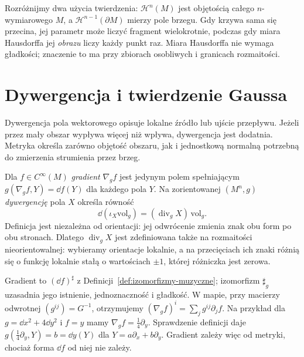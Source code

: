 Rozróżnijmy dwa użycia twierdzenia:
$\mathcal H^n(M)$ jest objętością całego
$n$-wymiarowego $M$, a
$\mathcal H^{n-1}(\partial M)$ mierzy
pole brzegu. Gdy krzywa sama się przecina,
jej parametr może liczyć fragment
wielokrotnie, podczas gdy miara Hausdorffa
jej \emph{obrazu} liczy każdy punkt raz.
Miara Hausdorffa nie wymaga gładkości;
znaczenie to ma przy zbiorach osobliwych
i granicach rozmaitości.

\section{Dywergencja i twierdzenie Gaussa}
\label{sec:metryka-gauss}

Dywergencja pola wektorowego opisuje lokalne
źródło lub ujście przepływu. Jeżeli przez mały
obszar wypływa więcej niż wpływa, dywergencja
jest dodatnia. Metryka określa zarówno objętość
obszaru, jak i jednostkową normalną potrzebną
do zmierzenia strumienia przez brzeg.

\begin{definicja}
\label{def:gradient-dywergencja}
Dla $f\in C^\infty(M)$ \emph{gradient} $\nabla_g f$
jest jedynym polem spełniającym
$g(\nabla_g f,Y)=\dd f(Y)$ dla każdego pola $Y$.
Na zorientowanej $(M^n,g)$ \emph{dywergencję}
pola $X$ określa równość
\begin{equation}\label{eq:dywergencja-forma}
 \dd(\iota_X\mathrm{vol}_g)
       =(\operatorname{div}_g X)\,\mathrm{vol}_g.
\end{equation}
Definicja jest niezależna od orientacji:
jej odwrócenie zmienia znak obu form
po obu stronach. Dlatego $\operatorname{div}_gX$
jest zdefiniowana także na rozmaitości
nieorientowalnej: wybieramy orientacje lokalnie, a na
przecięciach ich znaki różnią się o funkcję lokalnie stałą
o wartościach $\pm1$, której różniczka jest zerowa.
\end{definicja}

Gradient to $(\dd f)^\sharp$ z
Definicji~\ref{def:izomorfizmy-muzyczne};
izomorfizm $\sharp_g$ uzasadnia jego istnienie,
jednoznaczność i gładkość.
W mapie, przy macierzy odwrotnej
$(g^{ij})=G^{-1}$, otrzymujemy
$(\nabla_gf)^i=\sum_jg^{ij}\partial_jf$.
Na przykład dla $g=\dd x^2+4\dd y^2$ i $f=y$
mamy $\nabla_gf=\frac14\partial_y$.
Sprawdzenie definicji daje
$g(\frac14\partial_y,Y)=b=\dd y(Y)$ dla $Y=a\partial_x+b\partial_y$.
Gradient zależy więc od metryki, chociaż forma $\dd f$ od niej nie zależy.


